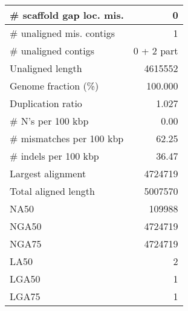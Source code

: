 \documentclass[12pt,a4paper]{article}
\begin{document}
\begin{table}[ht]
\begin{center}
\begin{tabular}{|l*{1}{|r}|}
\# scaffold gap loc. mis. & 0 \\ \hline
\# unaligned mis. contigs & 1 \\ \hline
\# unaligned contigs & 0 + 2 part \\ \hline
Unaligned length & 4615552 \\ \hline
Genome fraction (\%) & 100.000 \\ \hline
Duplication ratio & 1.027 \\ \hline
\# N's per 100 kbp & 0.00 \\ \hline
\# mismatches per 100 kbp & 62.25 \\ \hline
\# indels per 100 kbp & 36.47 \\ \hline
Largest alignment & 4724719 \\ \hline
Total aligned length & 5007570 \\ \hline
NA50 & 109988 \\ \hline
NGA50 & 4724719 \\ \hline
NGA75 & 4724719 \\ \hline
LA50 & 2 \\ \hline
LGA50 & 1 \\ \hline
LGA75 & 1 \\ \hline
\end{tabular}
\end{center}
\end{table}
\end{document}
